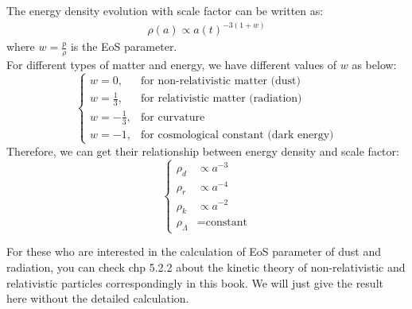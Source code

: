 \bigskip \noindent
\begin{theory}
    The energy density evolution with scale factor can be written as:
    \begin{align*}
        \rho(a) \propto a(t)^{-3(1+w)}
    \end{align*}
    where $w = \frac{p}{\rho}$ is the EoS parameter. \\

    For different types of matter and energy, we have different values of $w$ as below:
    \[
        \begin{cases}
            w = 0, & \text{for non-relativistic matter (dust)} \\
            w = \frac{1}{3}, & \text{for relativistic matter (radiation)} \\
            w = - \frac{1}{3}, & \text{for curvature} \\
            w = -1, & \text{for cosmological constant (dark energy)}
        \end{cases}
    \]
    Therefore, we can get their relationship between energy density and scale factor:
    \[
        \begin{cases}
            \rho_{d} &\propto a^{-3} \\
            \rho_{r} &\propto a^{-4} \\
            \rho_{k} &\propto a^{-2} \\
            \rho_{\Lambda} &= \text{constant}
        \end{cases}
    \]
\end{theory}

\begin{remark}
    For these who are interested in the calculation of EoS parameter of dust and radiation, you can check chp 5.2.2 about the kinetic theory of non-relativistic and relativistic particles correspondingly in this book. We will just give the result here without the detailed calculation. \\
\end{remark}


